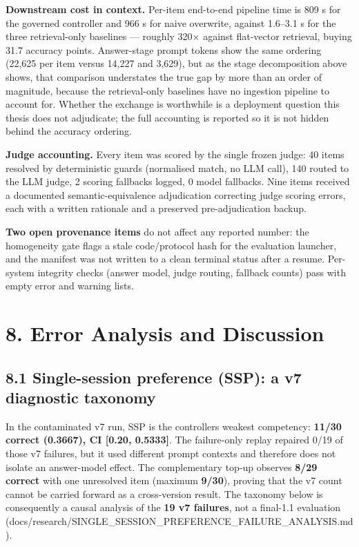 \textbf{Downstream cost in context.} Per-item end-to-end pipeline time
is 809 s for the governed controller and 966 s for naive overwrite,
against 1.6--3.1 s for the three retrieval-only baselines --- roughly
320× against flat-vector retrieval, buying 31.7 accuracy points.
Answer-stage prompt tokens show the same ordering (22,625 per item
versus 14,227 and 3,629), but as the stage decomposition above shows,
that comparison understates the true gap by more than an order of
magnitude, because the retrieval-only baselines have no ingestion
pipeline to account for. Whether the exchange is worthwhile is a
deployment question this thesis does not adjudicate; the full accounting
is reported so it is not hidden behind the accuracy ordering.

\textbf{Judge accounting.} Every item was scored by the single frozen
judge: 40 items resolved by deterministic guards (normalised match, no
LLM call), 140 routed to the LLM judge, 2 scoring fallbacks logged, 0
model fallbacks. Nine items received a documented semantic-equivalence
adjudication correcting judge scoring errors, each with a written
rationale and a preserved pre-adjudication backup.

\textbf{Two open provenance items} do not affect any reported number:
the homogeneity gate flags a stale code/protocol hash for the evaluation
launcher, and the manifest was not written to a clean terminal status
after a resume. Per-system integrity checks (answer model, judge
routing, fallback counts) pass with empty error and warning lists.

\section{8. Error Analysis and
Discussion}\label{error-analysis-and-discussion}

\subsection{8.1 Single-session preference (SSP): a v7 diagnostic
taxonomy}\label{single-session-preference-ssp-a-v7-diagnostic-taxonomy}

In the contaminated v7 run, SSP is the controller\textquotesingle s
weakest competency: \textbf{11/30 correct (0.3667), CI {[}0.20,
0.5333{]}}. The failure-only replay repaired 0/19 of those v7 failures,
but it used different prompt contexts and therefore does not isolate an
answer-model effect. The complementary top-up observes \textbf{8/29
correct} with one unresolved item (maximum \textbf{9/30}), proving that
the v7 count cannot be carried forward as a cross-version result. The
taxonomy below is consequently a causal analysis of the \textbf{19 v7
failures}, not a final-1.1 evaluation
(docs/research/SINGLE\_SESSION\_PREFERENCE\_FAILURE\_ANALYSIS.md).

